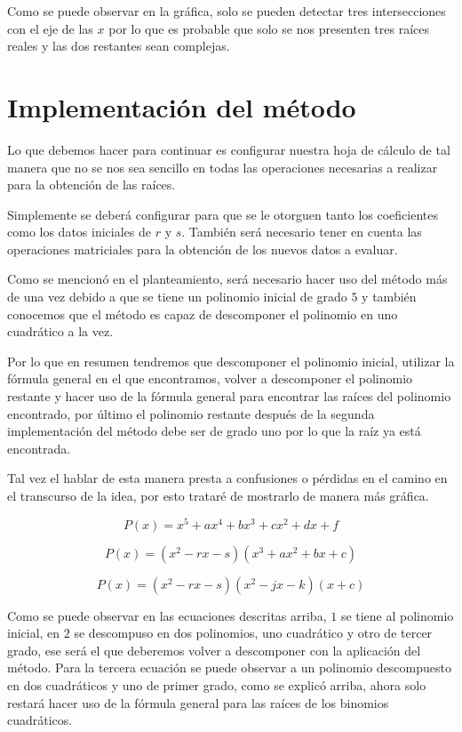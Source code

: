 \documentclass{article}
\begin{document}
Como se puede observar en la gráfica, solo se pueden detectar tres intersecciones
con el eje de las $x$ por lo que es probable que solo se nos presenten tres raíces
reales y las dos restantes sean complejas.


\section{Implementación del método}
Lo que debemos hacer para continuar es configurar nuestra hoja de cálculo de tal
manera que no se nos sea sencillo en todas las operaciones necesarias a realizar
para la obtención de las raíces.


Simplemente se deberá configurar para que se le otorguen tanto los coeficientes como
los datos iniciales de $r$ y $s$. También será necesario tener en cuenta las
operaciones matriciales para la obtención de los nuevos datos a evaluar.


Como se mencionó en el planteamiento, será necesario hacer uso del método más de
una vez debido a que se tiene un polinomio inicial de grado $5$ y también conocemos
que el método es capaz de descomponer el polinomio en uno cuadrático a la vez.


Por lo que en resumen tendremos que descomponer el polinomio inicial, utilizar la fórmula
general en el que encontramos, volver a descomponer el polinomio restante y hacer uso
de la fórmula general para encontrar las raíces del polinomio encontrado, por último
el polinomio restante después de la segunda implementación del método debe ser de
grado uno por lo que la raíz ya está encontrada.


Tal vez el hablar de esta manera presta a confusiones o pérdidas en el camino en
el transcurso de la idea, por esto trataré de mostrarlo de manera más gráfica.


\begin{equation}
   P(x) = x^5 + ax^4 +bx^3 +cx^2 +dx +f
\end{equation}


\begin{equation}
   P(x) = (x^2-rx-s)(x^3+ax^2+bx+c)
\end{equation}


\begin{equation}
   P(x) = (x^2-rx-s)(x^2-jx-k)(x + c)
\end{equation}


Como se puede observar en las ecuaciones descritas arriba, $1$ se tiene al polinomio
inicial, en $2$ se descompuso en dos polinomios, uno cuadrático y otro de tercer grado,
ese será el que deberemos volver a descomponer con la aplicación del método. Para la
tercera ecuación se puede observar a un polinomio descompuesto en dos cuadráticos y
uno de primer grado, como se explicó arriba, ahora solo restará hacer uso de la fórmula
general para las raíces de los binomios cuadráticos.
\end{document}
